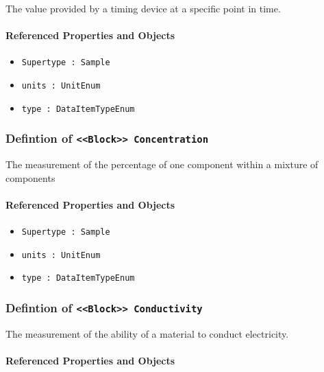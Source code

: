 \FloatBarrier

The value provided by a timing device at a specific point in time.

\FloatBarrier
\paragraph{Referenced Properties and Objects}

\begin{itemize}
\item \texttt{Supertype : Sample}

\item \texttt{units : UnitEnum}

\item \texttt{type : DataItemTypeEnum}

\end{itemize}
\FloatBarrier
\subsubsection{Defintion of \texttt{<<Block>> Concentration}}
  \label{type:Concentration}

\FloatBarrier

The measurement of the percentage of one component within a mixture of components

\FloatBarrier
\paragraph{Referenced Properties and Objects}

\begin{itemize}
\item \texttt{Supertype : Sample}

\item \texttt{units : UnitEnum}

\item \texttt{type : DataItemTypeEnum}

\end{itemize}
\FloatBarrier
\subsubsection{Defintion of \texttt{<<Block>> Conductivity}}
  \label{type:Conductivity}

\FloatBarrier

The measurement of the ability of a material to conduct electricity.

\FloatBarrier
\paragraph{Referenced Properties and Objects}

